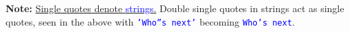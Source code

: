 \vspace{-1em}
\noindent
\begin{Note}
    \textbf{Note:} \underline{Single quotes denote \textcolor{blue}{strings}.} Double single quotes in strings act as single quotes, seen in
    the above with \textcolor{blue}{\texttt{'Who''s next'}} becoming \textcolor{blue}{\texttt{Who's next}}.
\end{Note}








